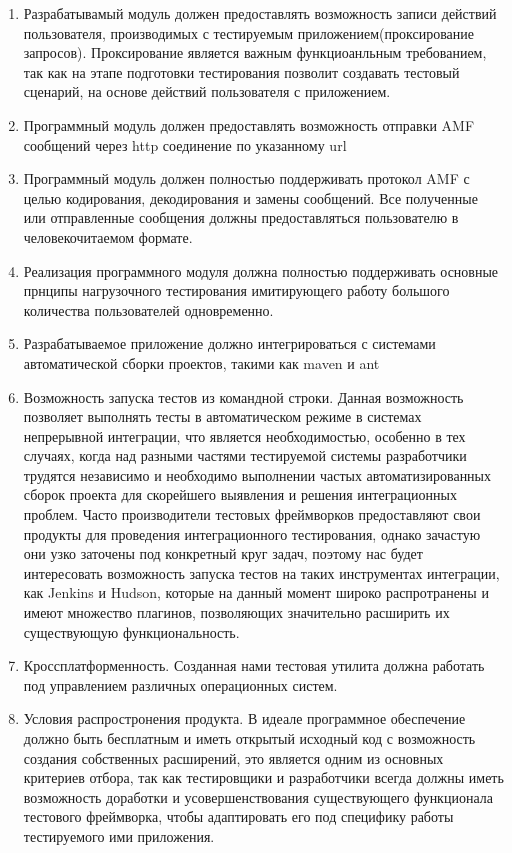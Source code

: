 \begin{enumerate}
\item Разрабатывамый модуль должен предоставлять возможность записи действий пользователя,
производимых с тестируемым приложением(проксирование запросов). Проксирование является важным функциоанльным
требованием, так как на этапе подготовки тестирования позволит создавать тестовый сценарий, на основе действий
пользователя с приложением.
\item Программный модуль должен предоставлять возможность отправки AMF сообщений через http соединение по
указанному url
\item Программный модуль должен полностью поддерживать протокол AMF с целью кодирования, декодирования и замены
сообщений. Все полученные или отправленные сообщения должны предоставляться пользователю в человекочитаемом
формате.
\item Реализация программного модуля должна полностью поддерживать основные прнципы нагрузочного тестирования
имитирующего работу большого количества пользователей одновременно.
\item Разрабатываемое приложение должно интегрироваться с системами автоматической сборки проектов, такими как maven и ant
\item Возможность запуска тестов из командной строки. Данная возможность позволяет
выполнять тесты в автоматическом режиме в системах непрерывной интеграции, что
является необходимостью, особенно в тех случаях, когда над разными частями
тестируемой системы разработчики трудятся независимо и необходимо
выполнении частых автоматизированных сборок проекта для скорейшего
выявления и решения интеграционных проблем. Часто производители тестовых
фреймворков предоставляют свои продукты для проведения интеграционного тестирования, однако
зачастую они узко заточены под конкретный круг задач, поэтому нас будет интересовать
возможность запуска тестов на таких инструментах интеграции, как Jenkins и
Hudson, которые на данный момент широко распротранены и имеют множество плагинов, позволяющих
значительно расширить их существующую функциональность.
\item Кроссплатформенность. Созданная нами тестовая утилита должна работать
под управлением различных операционных систем.
\item Условия распростронения продукта. В идеале программное обеспечение должно быть
бесплатным и иметь открытый исходный код с возможность создания собственных расширений,
это является одним из основных критериев отбора, так как тестировщики и разработчики
всегда должны иметь возможность доработки и усовершенствования существующего функционала
тестового фреймворка, чтобы адаптировать его под специфику работы тестируемого ими приложения.
\end{enumerate}

